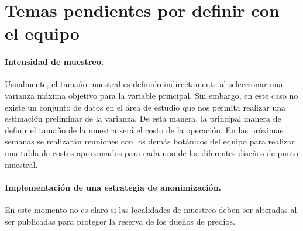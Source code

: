 \documentclass[12pt,letterpaper]{article}
\begin{document}
\section*{Temas pendientes por definir con el equipo}

\paragraph{Intensidad de muestreo.} Usualmente, el tama\~no muestral es definido indirectamente al seleccionar una varianza m\'axima objetivo para la variable principal. Sin embargo, en este caso no existe un conjunto de datos en el \'area de estudio que nos permita realizar una estimaci\'on preliminar de la varianza. De esta manera, la principal manera de definir el tamaño de la muestra ser\'a el costo de la operaci\'on. En las pr\'oximas semanas se realizar\'an reuniones con los dem\'as bot\'anicos del equipo para realizar una tabla de costos aproximados para cada uno de los diferentes dise\~nos de punto muestral.

\paragraph{Implementaci\'on de una estrategia de anonimizaci\'on.} En este momento no es claro si las localidades de muestreo deben ser alteradas al ser publicadas para proteger la reserva de los due\~nos de predios.



\end{document}
